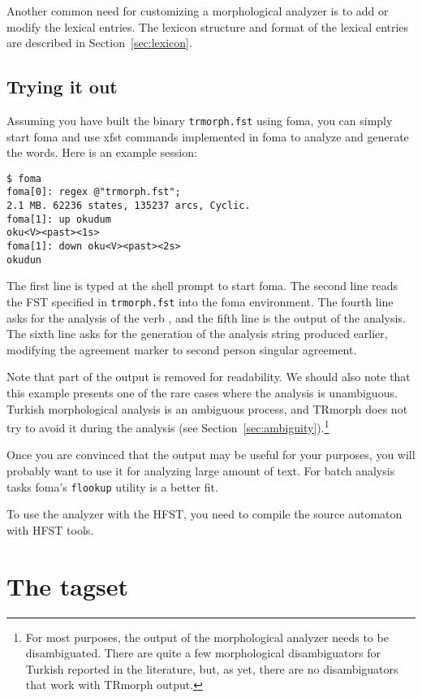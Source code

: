 \documentclass[twocolumn]{article}
\begin{document}
Another common need for customizing a morphological analyzer is to add
or modify the lexical entries. The lexicon structure and format of the
lexical entries are described in Section~\ref{sec:lexicon}.

\subsection{\label{sec:try}Trying it out}

Assuming you have built the binary \lstinline{trmorph.fst} using foma,
you can simply start foma and use xfst commands implemented in foma to
analyze and generate the words. Here is an example session:

\begin{lstlisting}[basicstyle={\color{blue!60!black!90}\small\tt}]
$ foma
foma[0]: regex @"trmorph.fst";
2.1 MB. 62236 states, 135237 arcs, Cyclic.
foma[1]: up okudum
oku<V><past><1s>
foma[1]: down oku<V><past><2s>
okudun
\end{lstlisting}%

The first line is  typed at the shell prompt to start foma.  The
second line reads the FST specified in \lstinline{trmorph.fst} into
the foma environment. The fourth line asks for the analysis of the verb
, and the fifth line is the output of the
analysis. The sixth line asks for the generation of the analysis string
produced earlier, modifying the agreement marker to  second person
singular agreement.

Note that part of the output is removed for readability. We should
also note that this example presents one of the rare cases where the
analysis is unambiguous. Turkish morphological analysis is an
ambiguous process, and TRmorph does not try to avoid it during the
analysis (see Section~\ref{sec:ambiguity}).\footnote{For most
purposes, the output of the morphological analyzer needs to be
disambiguated.  There are quite a few morphological disambiguators for
Turkish reported in the literature, but, as yet, there are no 
disambiguators that work with TRmorph output.}

Once you are convinced that the output may be useful for your
purposes, you will probably want to use it for analyzing large amount
of text. For batch analysis tasks  foma's \lstinline{flookup} utility
is a better fit. 

To use the analyzer with the HFST, you need to compile the source
automaton with HFST tools. 

\section{The tagset}
\end{document}

